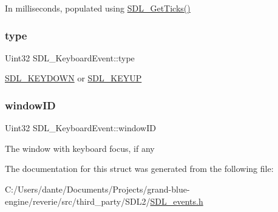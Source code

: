 In milliseconds, populated using \mbox{\hyperlink{_s_d_l__timer_8h_a0b9bc71d6287e0ffafdc3419760fe2b3}{S\+D\+L\+\_\+\+Get\+Ticks()}} \mbox{\label{struct_s_d_l___keyboard_event_ae0b2f2aace6f80c1f47e5a14350d409a}} 
\subsubsection{\texorpdfstring{type}{type}}
{\footnotesize\ttfamily Uint32 S\+D\+L\+\_\+\+Keyboard\+Event\+::type}

\mbox{\hyperlink{_s_d_l__events_8h_a3b589e89be6b35c02e0dd34a55f3fccaacaf8cfd53c985cdbf6a90c811d51a1fc}{S\+D\+L\+\_\+\+K\+E\+Y\+D\+O\+WN}} or \mbox{\hyperlink{_s_d_l__events_8h_a3b589e89be6b35c02e0dd34a55f3fccaadefb8866b9d28be21c2c33c35cc66c4b}{S\+D\+L\+\_\+\+K\+E\+Y\+UP}} \mbox{\label{struct_s_d_l___keyboard_event_a56efb6780b96acd5b50d8f797efb3546}} 
\subsubsection{\texorpdfstring{windowID}{windowID}}
{\footnotesize\ttfamily Uint32 S\+D\+L\+\_\+\+Keyboard\+Event\+::window\+ID}

The window with keyboard focus, if any 

The documentation for this struct was generated from the following file\+:\begin{DoxyCompactItemize}
\item 
C\+:/\+Users/dante/\+Documents/\+Projects/grand-\/blue-\/engine/reverie/src/third\+\_\+party/\+S\+D\+L2/\mbox{\hyperlink{_s_d_l__events_8h}{S\+D\+L\+\_\+events.\+h}}\end{DoxyCompactItemize}
